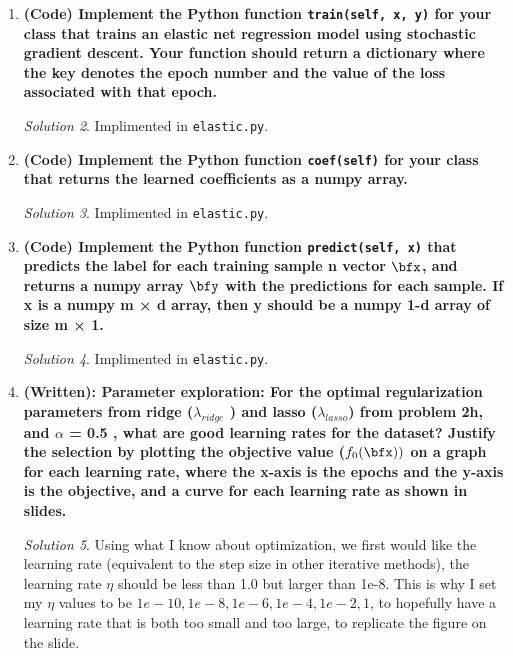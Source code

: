 \documentclass[a4paper,12pt]{article}
\theoremstyle{definition}
\theoremstyle{remark}
\newtheorem*{solution}{Solution}
\DeclareMathOperator{\prox}{prox}
\begin{document}
\begin{enumerate}
\begin{enumerate}
{		As a reminder, given step size $\eta$ and regularization parameter $\lambda$ s.t
			$f(x) = g(x) + \lambda\norm{x}_1$ , the proximal update is:}
			\begin{align}
				\prox(x_i) &= \begin{cases}
					x_i - \lambda\eta, &\text{if } x_i > \lambda\eta\\
					0, &\text{if }  -\lambda\eta \leq x_i \leq \lambda\eta\\
					x_i + \lambda\eta, &\text{if } x_i < \lambda\eta\\
				\end{cases}
			\end{align}
		\begin{solution}
			Implimented in \texttt{elastic.py}.
		\end{solution}
		\item {\bf (Code) Implement the Python function \texttt{train(self, x, y)} for your class that trains an elastic net regression model using stochastic gradient descent. Your function should return a dictionary where the key denotes the epoch number and the value of the loss associated with that epoch.}
		\begin{solution}
			Implimented in \texttt{elastic.py}.
		\end{solution}
		\item {\bf(Code) Implement the Python function \texttt{coef(self)} for your class that returns the learned coefficients as a numpy array.}
		\begin{solution}
			Implimented in \texttt{elastic.py}.
		\end{solution}
		\item {\bf(Code) Implement the Python function \texttt{predict(self, x)} that predicts the label for each training sample n vector $\bfx$, and returns a numpy array $\bfy$ with the predictions for each sample. If x is a numpy m × d array, then y should be a numpy 1-d array of size m × 1.}
		\begin{solution}
			Implimented in \texttt{elastic.py}.
		\end{solution}
		\item {\bf (Written): Parameter exploration: For the optimal regularization parameters from ridge ($\lambda_{ridge}$ ) and lasso ($\lambda_{lasso}$) from problem 2h, and $\alpha$ = 0.5 , what are good learning rates for the dataset? Justify the selection by plotting the objective value ($f_{0}(\bfx))$ on a graph for each learning rate, where the x-axis is the epochs and the y-axis is the objective, and a curve for each learning rate as shown in slides.}
		\begin{solution}
			Using what I know about optimization, we first would like the learning rate (equivalent to the step size in other iterative methods), the learning rate $\eta$ should be less than 1.0 but larger than 1e-8. This is why I set my $\eta$ values to be $1e-10, 1e-8,1e-6, 1e-4,1e-2,1$, to hopefully have a learning rate that is both too small and too large, to replicate the figure on the slide.
			

\end{solution}
\end{enumerate}
\end{enumerate}
\end{document}
